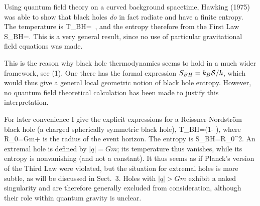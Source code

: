 Using quantum field theory on a curved background
spacetime, Hawking (1975) was able to show that black holes
{\em do} in fact radiate and have a finite entropy. The temperature is
\be T_{BH}=\ , \ee
and the entropy therefore from the First Law
\be S_{BH}=\enspace . \ee
This is a very general result, since no use of particular
gravitational field equations was made.

\vskip 2mm
\small

This is the reason why black hole thermodynamics seems to hold
in a much wider framework, see (1). One there has
the formal expression $S_{BH}=
k_B{\cal S}/\hbar$, which would thus give a general local geometric
notion of black hole entropy. However, no quantum field theoretical
calculation has been made to justify this interpretation.

\vskip 2mm
\normalsize

For later convenience I give the explicit expressions for a
Reissner-Nordstr\"om black hole (a charged spherically symmetric
black hole),
\be T_{BH}=\left(1-
    \right)\enspace , \ee
where
\be R_0=Gm+ \ee
is the radius of the event horizon. The entropy is
\be S_{BH}=\pi R_0^2\enspace .\ee
An extremal hole is defined by $\vert q\vert=Gm$; its temperature
thus vanishes, while its entropy is nonvanishing
 (and not a constant).
It thus seems as if Planck's version of the Third Law were violated,
but the situation for extremal holes is more subtle, as will
be discussed in Sect.~3. Holes with $\vert q\vert>Gm$ exhibit
a naked singularity and are therefore generally excluded
from consideration, although their role within quantum gravity
is unclear.

